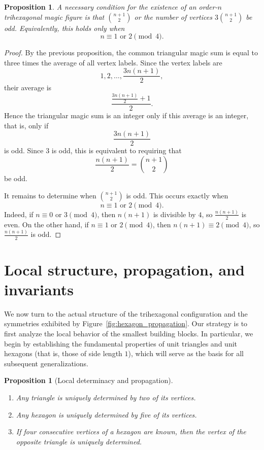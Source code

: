 \documentclass[11pt]{article}
\theoremstyle{plain}
\newtheorem{proposition}[theorem]{Proposition}
\theoremstyle{definition}
\begin{document}
\begin{proposition}
A necessary condition for the existence of an order-$n$ trihexagonal magic figure is that
$\binom{n+1}{2}$ or the number of vertices $3 \binom{n+1}{2}$
be odd. Equivalently, this holds only when
\[
n \equiv 1 \text{ or } 2 \pmod{4}.
\]
\end{proposition}

\begin{proof}
By the previous proposition, the common triangular magic sum is equal to three times the average of all vertex labels. Since the vertex labels are
\[
1,2,\dots,\frac{3n(n+1)}{2},
\]
their average is
\[
\frac{\frac{3n(n+1)}{2}+1}{2}.
\]
Hence the triangular magic sum is an integer only if this average is an integer, that is, only if
\[
\frac{3n(n+1)}{2}
\]
is odd. Since $3$ is odd, this is equivalent to requiring that
\[
\frac{n(n+1)}{2}=\binom{n+1}{2}
\]
be odd.

It remains to determine when $\binom{n+1}{2}$ is odd. This occurs exactly when
\[
n \equiv 1 \text{ or } 2 \pmod{4}.
\]
Indeed, if $n\equiv 0$ or $3\pmod{4}$, then $n(n+1)$ is divisible by $4$, so $\frac{n(n+1)}{2}$ is even. On the other hand, if $n\equiv 1$ or $2\pmod{4}$, then $n(n+1)\equiv 2\pmod{4}$, so $\frac{n(n+1)}{2}$ is odd.
\end{proof}


\section{Local structure, propagation, and invariants}

We now turn to the actual structure of the trihexagonal configuration and the symmetries exhibited by Figure~\ref{fig:hexagon_propagation}. 
Our strategy is to first analyze the local behavior of the smallest building blocks. 
In particular, we begin by establishing the fundamental properties of unit triangles and unit hexagons (that is, those of side length $1$), which will serve as the basis for all subsequent generalizations.

\begin{proposition}[Local determinacy and propagation]
\
\begin{enumerate}
    \item Any triangle is uniquely determined by two of its vertices.
    \item Any hexagon is uniquely determined by five of its vertices.
    \item If four consecutive vertices of a hexagon are known, then the vertex of the opposite triangle is uniquely determined.
\end{enumerate}
\end{proposition}
\end{document}
